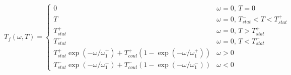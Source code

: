 \documentclass{standalone}
\begin{document}
\(
 T_f(\omega, T) = \left\{
\begin{array}{ll}
 0 & \omega = 0, \, T = 0 \\
 T & \omega = 0, \, T_{stat}^{-} < T < T_{stat}^{+} \\
 T_{stat}^{+} & \omega = 0, \, T > T_{stat}^{+} \\
 T_{stat}^{-} & \omega = 0, \, T < T_{stat}^{-} \\
 T_{stat}^{+} \exp\left( -\omega / \omega_{1}^{+} \right) + T_{coul}^{+} \left( 1 - \exp\left( -\omega / \omega_{1}^{+} \right) \right) & \omega > 0 \\
 T_{stat}^{-} \exp\left( -\omega / \omega_{1}^{-} \right) + T_{coul}^{-} \left( 1 - \exp\left( -\omega / \omega_{1}^{-} \right) \right) & \omega < 0
\end{array}
\right.
\)
\end{document}
